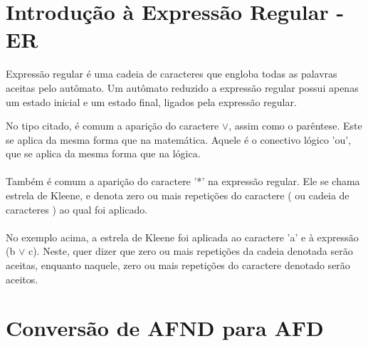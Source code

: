 \documentclass[a4paper,10pt]{article} %
\begin{document}
\section{Introdução à Expressão Regular - ER}

Expressão regular é uma cadeia de caracteres que engloba todas as palavras aceitas pelo autômato. Um autômato reduzido a expressão regular possui apenas um estado inicial e um estado final, ligados pela expressão regular.
\begin{center}
\end{center}


No tipo citado, é comum a aparição do caractere {$\lor$}, assim como o parêntese. Este se aplica da mesma forma que na matemática. Aquele é o conectivo lógico 'ou', que se aplica da mesma forma que na lógica.\\\\Também é comum a aparição do caractere '*' na expressão regular. Ele se chama estrela de Kleene, e denota zero ou mais repetições do caractere ( ou cadeia de caracteres ) ao qual foi aplicado.\\\\No exemplo acima, a estrela de Kleene foi aplicada ao caractere 'a' e à expressão (b {$\lor$} c). Neste, quer dizer que zero ou mais repetições da cadeia denotada serão aceitas, enquanto naquele, zero ou mais repetições do caractere denotado serão aceitos.


\section{Conversão de AFND para AFD}
\end{document}
